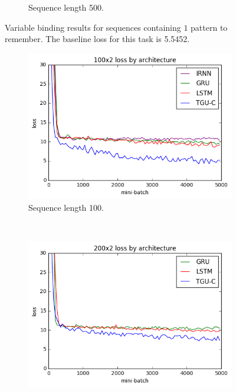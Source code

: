 \begin{figure}[p]
\begin{subfigure}[t]{0.3\linewidth}
	\caption{Sequence length 500.}
\end{subfigure}

\caption[Variable binding results, one pattern]
{Variable binding results for sequences containing \(1\) pattern to remember. The baseline loss for this
task is 5.5452.}
\label{fig:vbindn1}
\end{figure}

\begin{figure}[p]
\begin{subfigure}[t]{0.3\linewidth}
	\includegraphics[width=\linewidth]{exps/vbind/plots/100x2}
	\caption{Sequence length 100.}
\end{subfigure}~
\begin{subfigure}[t]{0.3\linewidth}
	\includegraphics[width=\linewidth]{exps/vbind/plots/200x2}

\end{subfigure}
\end{figure}
